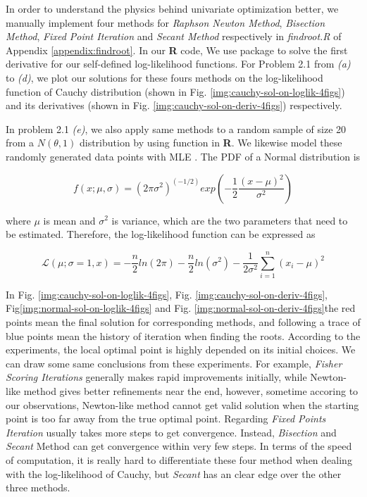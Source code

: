 In order to understand the physics behind univariate optimization better, we manually implement four methods for \textit{Raphson Newton Method}, \textit{Bisection Method}, \textit{Fixed Point Iteration} and \textit{Secant Method} respectively in \textit{findroot.R} of Appendix \ref{appendix:findroot}. In our \textbf{R} code, We use  package to solve the first derivative for our self-defined log-likelihood functions. For Problem 2.1 from \textit{(a)} to \textit{(d)}, we plot our solutions for these fours methods on the log-likelihood function of Cauchy distribution (shown in Fig. \ref{img:cauchy-sol-on-loglik-4figs}) and its derivatives (shown in Fig. \ref{img:cauchy-sol-on-deriv-4figs}) respectively.


In problem 2.1 \textit{(e)}, we also apply same methods to a random sample of size 20 from a $N(\theta, 1)$ distribution by using function  in \textbf{R}. We likewise model these randomly generated data points with MLE . The PDF of a Normal distribution is

$$f(x; \mu, \sigma) = (2 \pi \sigma^2) ^ (-1/2) exp(-\frac{1}{2} \frac{(x-\mu)^2}{\sigma^2})$$

where $\mu$ is mean and $\sigma^2$ is variance, which are the two parameters that need to be estimated. Therefore, the log-likelihood function can be expressed as

$$\mathcal L (\mu; \sigma=1, x) = - \frac{n}{2} ln(2 \pi) - \frac{n}{2} ln(\sigma^2) - \frac{1}{2 \sigma^2} \sum_{i=1}^{n} (x_i-\mu)^2$$


In Fig. \ref{img:cauchy-sol-on-loglik-4figs}, Fig. \ref{img:cauchy-sol-on-deriv-4figs}, Fig\ref{img:normal-sol-on-loglik-4figs} and Fig. \ref{img:normal-sol-on-deriv-4figs}the red points mean the final solution for corresponding methods, and following a trace of blue points mean the history of iteration when finding the roots. According to the experiments, the local optimal point is highly depended on its initial choices. We can draw some same conclusions from these experiments. For example, \textit{Fisher Scoring Iterations} generally makes rapid improvements initially, while Newton-like method gives better refinements near the end, however, sometime accoring to our observations, Newton-like method cannot get valid solution when the starting point is too far away from the true optimal point. Regarding \textit{Fixed Points Iteration} usually takes more steps to get convergence. Instead, \textit{Bisection} and \textit{Secant} Method can get convergence within very few steps. In terms of the speed of computation, it is really hard to differentiate these four method when dealing with the log-likelihood of Cauchy, but \textit{Secant} has an clear edge over the other three methods. 


